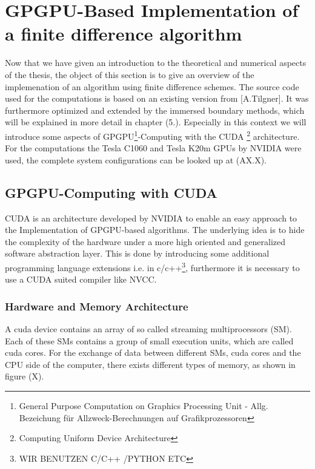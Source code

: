 \chapter[ GPGPU-Based Implementation of a finite difference algorithm]{GPGPU-Based Implementation of \\ a finite difference algorithm}


Now that we have given an introduction to the theoretical and numerical aspects of the thesis,
the object of this section is to give an overview of the implemenation of an algorithm using finite difference schemes.
The source code used for the computations is based on an existing version from [A.Tilgner].
It was furthermore optimized  and extended by the immersed boundary methods, which will be explained in more detail in chapter (5.).
Especially in this context we will introduce some aspects of GPGPU\footnote{General Purpose Computation on Graphics Processing Unit - Allg.  Bezeichung für Allzweck-Berechnungen auf Grafikprozessoren}-Computing
with the CUDA \footnote{Computing Uniform Device Architecture} architecture.
For the computations the  Tesla C1060 and Tesla K20m GPUs by NVIDIA were used, the complete system configurations can be looked up at (AX.X).

\section{GPGPU-Computing with CUDA}

CUDA is an architecture developed by NVIDIA to enable an easy approach to the Implementation of GPGPU-based algorithms.
The underlying idea is to hide the complexity of the hardware under a more high oriented and generalized software abstraction layer.
This is done by introducing some additional programming language extensions i.e. in c/c++\footnote{WIR BENUTZEN C/C++ /PYTHON ETC},
furthermore it is necessary to use a CUDA suited compiler like NVCC.

\subsection{Hardware and Memory Architecture}

A cuda device contains an array of so called streaming multiprocessors (SM).
Each of these SMs contains a group of small execution units, which are called cuda cores.
For the exchange of data between different SMs, cuda cores and the CPU side of the computer, there exists different
types of memory, as shown  in figure (X).
\newpage

